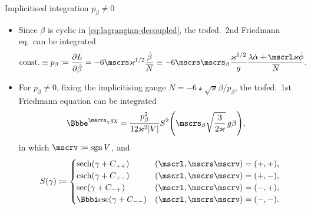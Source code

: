 \documentclass[9pt]{beamer}
\begin{document}
\begin{frame}%
{Implicitised integration}%
{$p_\beta \neq 0$}
\begin{itemize}
\item Since $\beta$ is cyclic in \cref{eq:lagrangian-decoupled},
the trsfed.\ 2nd Friedmann eq.\ can be integrated%
\begin{align}
\text{const.} \equiv p_\beta \coloneqq \frpa{L}{\dot{\beta}} &=
-6\mscrs\varkappa^{1/2}\frac{\dot{\beta}}{\overline{N}}
\equiv
-6\mscrs\mscrs_\beta\frac{\varkappa^{1/2}}{g}
\frac{\lambda\dot{\alpha}+\mscrl\varkappa\dot{\phi}}{\overline{N}}.
\end{align}

\item For $p_\beta \neq 0$, fixing the \alert{implicitising gauge}
$\overline{N} = -6\mscrs\sqrt{\varkappa}\dot{\beta}/p_\beta$, the trsfed.\
1st Friedmann equation can be integrated
\begin{align}
\ee^{\mscrs_\chi g\chi} &=
\frac{p_\beta^2}{12\varkappa^2\vbr{V}}
\rfun{S^2}{\mscrs_\beta \sqrt{\frac{3}{2\varkappa}}\,g \beta},
\end{align}
in which $\mscrv \coloneqq \sgn V$, and
\begin{align}
\rfun{S}{\gamma} \coloneqq
\begin{cases}
\rfun{\sech}{\gamma+C_{++}} & \rbr{\mscrl, \mscrs\mscrv} = \rbr{+,+}, \\
\rfun{\csch}{\gamma+C_{+-}} & \rbr{\mscrl, \mscrs\mscrv} = \rbr{+,-}, \\
\rfun{\sec}{\gamma+C_{-+}} & \rbr{\mscrl, \mscrs\mscrv} = \rbr{-,+}, \\
\ii\rfun{\csc}{\gamma+C_{--}} & \rbr{\mscrl, \mscrs\mscrv} = \rbr{-,-}. \\
\end{cases}
\end{align}
\end{itemize}
\end{frame}
\end{document}
